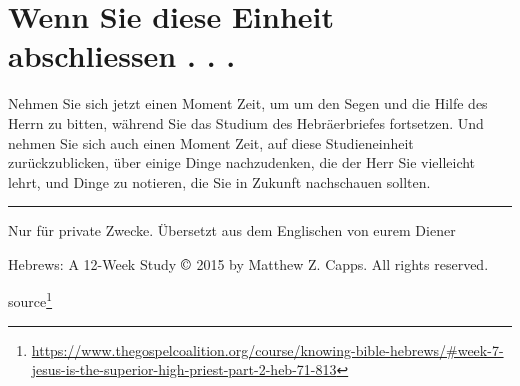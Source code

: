 \documentclass[
  12pt,
]{krantz}
\renewcommand{\href}[2]{#2\footnote{\url{#1}}}
\begin{document}
\hypertarget{wenn-sie-diese-einheit-abschliessen-.-.-.}{%
\section{Wenn Sie diese Einheit abschliessen . . .}\label{wenn-sie-diese-einheit-abschliessen-.-.-.}}

Nehmen Sie sich jetzt einen Moment Zeit, um um den Segen und die Hilfe des Herrn zu bitten, während Sie das Studium des Hebräerbriefes fortsetzen. Und nehmen Sie sich auch einen Moment Zeit, auf diese Studieneinheit zurückzublicken, über einige Dinge nachzudenken, die der Herr Sie vielleicht lehrt, und Dinge zu notieren, die Sie in Zukunft nachschauen sollten.

\begin{center}\rule{0.5\linewidth}{0.5pt}\end{center}

Nur für private Zwecke. Übersetzt aus dem Englischen von eurem Diener

Hebrews: A 12-Week Study \(\copyright\) 2015 by Matthew Z. Capps. All rights reserved.

\href{https://www.thegospelcoalition.org/course/knowing-bible-hebrews/\#week-7-jesus-is-the-superior-high-priest-part-2-heb-71-813}{source}

  

\printindex
\end{document}
